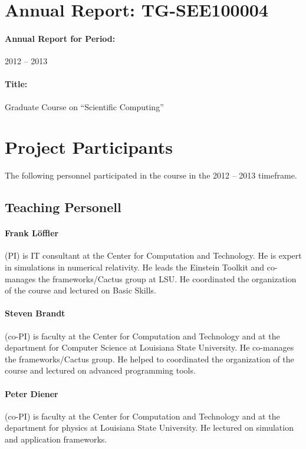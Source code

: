 \documentclass[11pt]{article}
\begin{document}
\section*{Annual Report: TG-SEE100004}

\paragraph{Annual Report for Period:}
2012 -- 2013

\paragraph{Title:} Graduate Course on ``Scientific Computing''\

\section{Project Participants}

The following personnel participated in the course in the 2012 -- 2013 timeframe.

\subsection{Teaching Personell}

\paragraph{Frank Löffler} (PI) is IT consultant at the Center for Computation
and Technology. He is expert in simulations in numerical relativity. He
leads the Einstein Toolkit and co-manages the frameworks/Cactus group
at LSU. He coordinated the organization of the course and lectured on
Basic Skills.

\paragraph{Steven Brandt} (co-PI) is faculty at the Center for Computation and
Technology and at the department for Computer Science at Louisiana State
University. He co-manages the frameworks/Cactus group. He helped to coordinated
the organization of the course and lectured on advanced programming tools.

\paragraph{Peter Diener} (co-PI) is faculty at the Center for Computation and
Technology and at the department for physics  at Louisiana State University. He
lectured on simulation and application frameworks.
\end{document}
